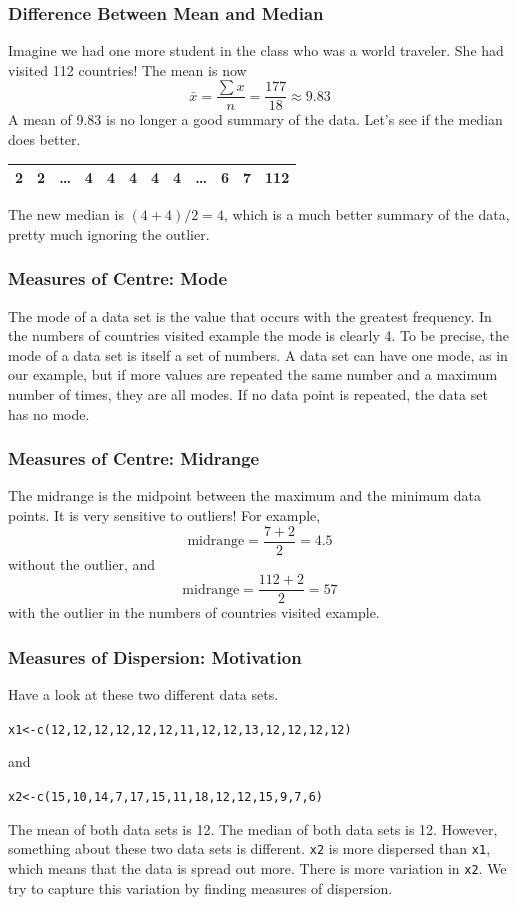 \documentclass[xcolor=dvipsnames]{beamer}
\begin{document}
\begin{frame}
  \frametitle{Difference Between Mean and Median}
Imagine we had one more student in the class who was a world traveler.
She had visited 112 countries! The mean is now
\begin{equation}
  \label{eq:zephahwu}
  \bar{x}=\frac{\sum{}x}{n}=\frac{177}{18}\approx{}9.83
\end{equation}
A mean of 9.83 is no longer a good summary of the data. Let's see if
the median does better.

\medskip

\begin{tabular}{|c|c|c|c|c|c|c|c|c|c|c|c|}\hline
2&2&{\ldots}&4&4&\alert{4}&\alert{4}&4&{\ldots}&6&7&112 \\ \hline
\end{tabular}

\medskip

The new median is $(4+4)/2=4$, which is a much better summary of the
data, pretty much ignoring the outlier.
\end{frame}

\begin{frame}
  \frametitle{Measures of Centre: Mode}
The \alert{mode} of a data set is the value that occurs with the
greatest frequency. In the numbers of countries visited example the
mode is clearly 4. To be precise, the mode of a data set is itself a
set of numbers. A data set can have one mode, as in our example, but
if more values are repeated the same number and a maximum number of
times, they are all modes. If no data point is repeated, the data set
has no mode.
\end{frame}

\begin{frame}
  \frametitle{Measures of Centre: Midrange}
The \alert{midrange} is the midpoint between the maximum and the
minimum data points. It is very sensitive to outliers! For example,
\begin{equation}
  \label{eq:nahjuise}
  \mbox{midrange}=\frac{7+2}{2}=4.5
\end{equation}
without the outlier, and
\begin{equation}
  \label{eq:foofieng}
  \mbox{midrange}=\frac{112+2}{2}=57
\end{equation}
with the outlier in the numbers of countries visited example.
\end{frame}

\begin{frame}
  \frametitle{Measures of Dispersion: Motivation}
Have a look at these two different data sets.
\begin{alltt}
x1<-c(12,12,12,12,12,12,11,12,12,13,12,12,12,12)
\end{alltt}
and
\begin{alltt}
x2<-c(15,10,14,7,17,15,11,18,12,12,15,9,7,6)
\end{alltt}
The mean of both data sets is 12. The median of both data sets is 12.
However, something about these two data sets is different. \texttt{x2}
is more dispersed than \texttt{x1}, which means that the data is
spread out more. There is more variation in \texttt{x2}. We try to
capture this variation by finding measures of dispersion.
\end{frame}
\end{document}
